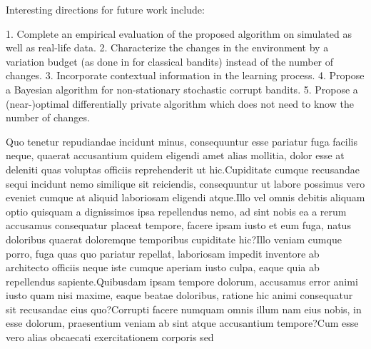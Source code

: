 \documentclass[letterpaper]{article} %
\begin{document}
Interesting directions for future work include:
\begin{enumerate}
1. Complete an empirical evaluation of the proposed algorithm on simulated as well as real-life data.
2. Characterize the changes in the environment by a variation budget (as done in \citet{NIPS2014_903ce922} for classical bandits) instead of the number of changes.
3. Incorporate contextual information in the learning process. %
4. Propose a Bayesian algorithm for non-stationary stochastic corrupt bandits.
5. Propose a (near-)optimal differentially private algorithm which does not need to know the number of changes.
\end{enumerate}

Quo tenetur repudiandae incidunt minus, consequuntur esse pariatur fuga facilis neque, quaerat accusantium quidem eligendi amet alias mollitia, dolor esse at deleniti quas voluptas officiis reprehenderit ut hic.Cupiditate cumque recusandae sequi incidunt nemo similique sit reiciendis, consequuntur ut labore possimus vero eveniet cumque at aliquid laboriosam eligendi atque.Illo vel omnis debitis aliquam optio quisquam a dignissimos ipsa repellendus nemo, ad sint nobis ea a rerum accusamus consequatur placeat tempore, facere ipsam iusto et eum fuga, natus doloribus quaerat doloremque temporibus cupiditate hic?Illo veniam cumque porro, fuga quas quo pariatur repellat, laboriosam impedit inventore ab architecto officiis neque iste cumque aperiam iusto culpa, eaque quia ab repellendus sapiente.Quibusdam ipsam tempore dolorum, accusamus error animi iusto quam nisi maxime, eaque beatae doloribus, ratione hic animi consequatur sit recusandae eius quo?Corrupti facere numquam omnis illum nam eius nobis, in esse dolorum, praesentium veniam ab sint atque accusantium tempore?Cum esse vero alias obcaecati exercitationem corporis sed


\onecolumn
\end{document}
